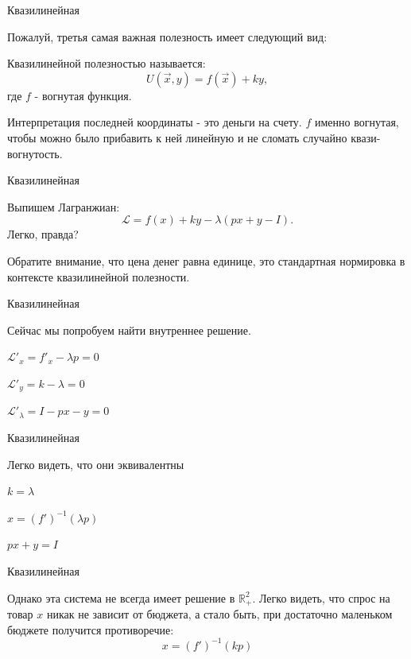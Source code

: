\documentclass{beamer}
\begin{document}
\begin{frame}{Квазилинейная}

Пожалуй, третья самая важная полезность имеет следующий вид:

\begin{definition}
\alert{Квазилинейной} полезностью называется:
$$U(\vec x, y) = f(\vec x) + k y,$$ 
где $f$ - вогнутая функция.
\end{definition}

Интерпретация последней координаты - это деньги на счету. $f$ именно вогнутая, чтобы можно было прибавить к ней линейную и не сломать случайно квази-вогнутость.
\end{frame}

\begin{frame}{Квазилинейная}

Выпишем Лагранжиан:
$$\mathcal{L} = f(x) + k y - \lambda (px + y - I).$$ 
Легко, правда?

Обратите внимание, что цена денег равна единице, это стандартная нормировка в контексте квазилинейной полезности.

\end{frame}

\begin{frame}{Квазилинейная}

Сейчас мы попробуем найти внутреннее решение.

$\mathcal{L}'_x = f'_x - \lambda p = 0$

$\mathcal{L}'_y = k - \lambda = 0$

$\mathcal{L}'_{\lambda} = I - p x - y= 0$

\end{frame}

\begin{frame}{Квазилинейная}

Легко видеть, что они эквивалентны

$k = \lambda$

$x = (f')^{-1}(\lambda p)$

$px + y = I$

\end{frame}

\begin{frame}{Квазилинейная}

Однако эта система не всегда имеет решение в $\mathbb{R}^2_{+}$. Легко видеть, что спрос на товар $x$ никак не зависит от бюджета, а стало быть, при достаточно маленьком бюджете получится противоречие:
$$ x = (f')^{-1}(kp)$$

\end{frame}
\end{document}
